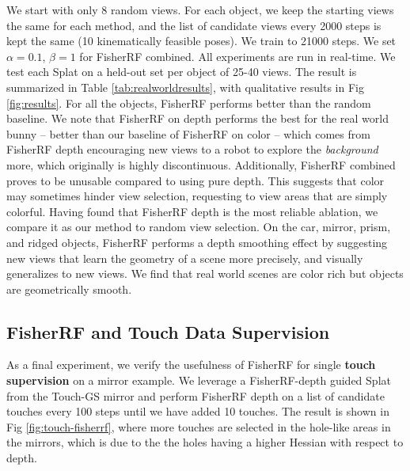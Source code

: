 \documentclass[letterpaper, 10 pt, conference]{ieeeconf}  %
\begin{document}
We start with only 8 random views. For each object, we keep the starting views the same for each method, and the list of candidate views every 2000 steps is kept the same (10 kinematically feasible poses). We train to 21000 steps. We set $\alpha = 0.1$, $\beta = 1$ for FisherRF combined. All experiments are run in real-time. We test each Splat on a held-out set per object of 25-40 views. The result is summarized in Table \ref{tab:realworldresults}, with qualitative results in Fig \ref{fig:results}. For all the objects, FisherRF performs better than the random baseline. We note that FisherRF on depth performs the best for the real world bunny -- better than our baseline of FisherRF on color -- which comes from FisherRF depth encouraging new views to a robot to explore the \textit{background} more, which originally is highly discontinuous. Additionally, FisherRF combined proves to be unusable compared to using pure depth. This suggests that color may sometimes hinder view selection, requesting to view areas that are simply colorful. Having found that FisherRF depth is the most reliable ablation, we compare it as our method to random view selection.  On the car, mirror, prism, and ridged objects, FisherRF performs a depth smoothing effect by suggesting new views that learn the geometry of a scene more precisely, and visually generalizes to new views. We find that real world scenes are color rich but objects are geometrically smooth. 



\subsection{FisherRF and Touch Data Supervision}
As a final experiment, we verify the usefulness of FisherRF for single \textbf{touch supervision} on a mirror example. We leverage a FisherRF-depth guided Splat from the Touch-GS mirror and perform FisherRF depth on a list of candidate touches every 100 steps until we have added 10 touches. The result is shown in Fig \ref{fig:touch-fisherrf}, where more touches are selected in the hole-like areas in the mirrors, which is due to the the holes having a higher Hessian with respect to depth.
\end{document}
